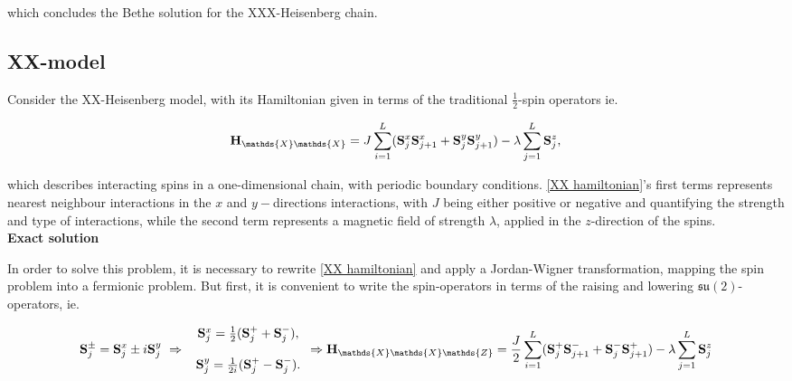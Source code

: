 \documentclass{homework}
\begin{document}
which concludes the Bethe solution for the XXX-Heisenberg chain.

\clearpage 

\subsection{XX-model}
%
Consider the XX-Heisenberg model, with its Hamiltonian given in terms of the traditional $\frac{1}{2}$-spin operators ie. 

\begin{equation}
    {\bf H}_{\mathds{X}\mathds{X}} = J \sum_{i=1}^{L} ({\bf S}_{j}^{x} {\bf S}_{j+1}^{x} + {\bf S}_{j}^{y} {\bf S}_{j+1}^{y}) - \lambda \sum_{j=1}^{L} {\bf S}_{j}^{z},
    \label{XX hamiltonian}
\end{equation}

which describes interacting spins in a one-dimensional chain, with periodic boundary conditions. \eqref{XX hamiltonian}'s first terms represents nearest neighbour interactions in the $x$ and $y-$directions  interactions, with $J$ being either positive or negative and quantifying the strength and type of interactions, while the second term represents a magnetic field of strength $\lambda$, applied in the $z$-direction of the spins. \\

{\textbf{Exact solution}}

In order to solve this problem, it is necessary to rewrite \eqref{XX hamiltonian} and apply a Jordan-Wigner transformation, mapping the spin problem into a fermionic problem. But first, it is convenient to write the spin-operators in terms of the raising and lowering $\mathfrak{su}(2)$-operators, ie.

$$
    \spin_j^{\pm} = \spin_j^{x} \pm i \spin_j^{y} \blanky \Rightarrow \blanky \begin{array}{c}
         \spin_{j}^x = \frac{1}{2} (\spin_j^+ + \spin_j^-), \\
          \\
         \spin_{j}^y = \frac{1}{2i} (\spin_j^+ - \spin_j^-). 
    \end{array} \Rightarrow {\bf H}_{\mathds{X}\mathds{X}\mathds{Z}} = \frac{J}{2} \sum_{i=1}^{L} ({\bf S}_{j}^{+} {\bf S}_{j+1}^{-} + {\bf S}_{j}^{-} {\bf S}_{j+1}^{+}) - \lambda \sum_{j=1}^{L} {\bf S}_{j}^{z}
     \label{raising Hamiltonian}
$$
\end{document}
